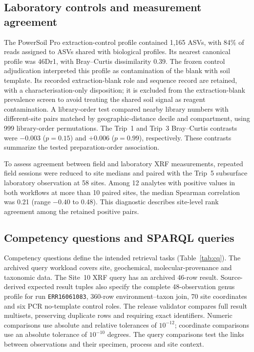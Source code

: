 \begin{revision}
\subsection{Laboratory controls and measurement agreement}


The PowerSoil Pro extraction-control profile contained 1,165 ASVs,
with 84\% of reads assigned to ASVs shared with biological profiles.
Its nearest canonical profile was 46Dr1, with Bray--Curtis
dissimilarity 0.39. The frozen control adjudication interpreted this profile as contamination of the blank with soil template. Its recorded extraction-blank role and sequence record are retained, with a characterisation-only disposition; it is excluded from the extraction-blank prevalence screen to avoid treating the shared soil signal as reagent contamination. A library-order test compared nearby library numbers with
different-site pairs matched by geographic-distance decile and
compartment, using 999 library-order permutations. The Trip~1 and
Trip~3 Bray--Curtis contrasts were $-0.003$ ($p=0.15$) and
$+0.006$ ($p=0.99$), respectively. These contrasts summarize the
tested preparation-order association.

To assess agreement between field and laboratory XRF measurements,
repeated field sessions were reduced to site medians and paired
with the Trip~5 subsurface laboratory observation at 58 sites.
Among 12 analytes with positive values in both workflows at more
than 10 paired sites, the median Spearman correlation was 0.21
(range $-0.40$ to 0.48).
This diagnostic describes site-level rank agreement among the
retained positive pairs.

\subsection{Competency questions and SPARQL queries}

Competency questions define the intended retrieval tasks
(Table~\ref{tab:cq}). The archived query workload covers site,
geochemical, molecular-provenance and taxonomic data. The
Site~10 XRF query has an archived 46-row result. Source-derived
expected result tuples also specify the complete 48-observation
genus profile for run \texttt{ERR16061083},
360-row environment--taxon join, 70 site coordinates and six
PCR no-template control roles. The release validator compares full
result multisets, preserving duplicate rows and requiring exact
identifiers. Numeric comparisons use absolute and relative
tolerances of $10^{-12}$; coordinate comparisons use an absolute
tolerance of $10^{-10}$ degrees. The query comparisons test the links between observations and their
specimen, process and site context.


\end{revision}
